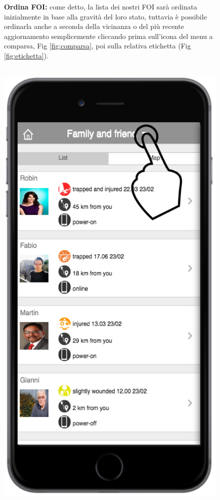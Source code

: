  \begin{figure}
 \textbf{Ordina FOI:} come detto, la lista dei nostri FOI sarà ordinata inizialmente in base alla gravità del loro stato, tuttavia è possibile ordinarla anche a seconda della vicinanza o del più recente aggiornamento semplicemente cliccando prima sull'icona del menu a comparsa, Fig \ref{fig:comparsa}, poi sulla relativa etichetta (Fig \ref{fig:etichetta}).
 \\ \\
 \begin{minipage}[b]{6cm}
   \centering
\includegraphics[scale=0.6]{interfaccia/comparsa.png}

\end{minipage}
\end{figure}

